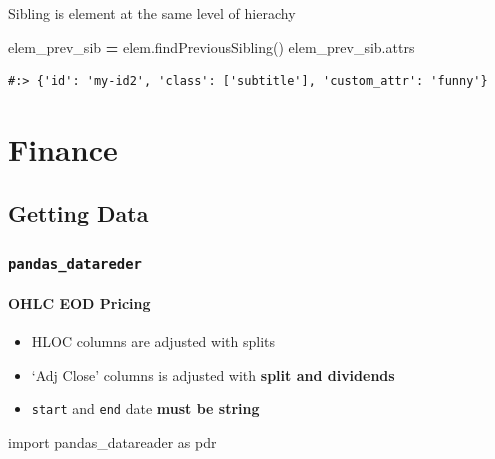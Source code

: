 \documentclass[
]{book}
\newenvironment{Shaded}{\begin{snugshade}}{\end{snugshade}}
\newcommand{\ImportTok}[1]{#1}
\newcommand{\NormalTok}[1]{#1}
\newcommand{\OperatorTok}[1]{\textcolor[rgb]{0.43,0.43,0.43}{\textbf{#1}}}
\providecommand{\tightlist}{%
  \setlength{\itemsep}{0pt}\setlength{\parskip}{0pt}}
\begin{document}
Sibling is element at the same level of hierachy

\begin{Shaded}
\begin{Highlighting}[]
\NormalTok{elem_prev_sib }\OperatorTok{=}\NormalTok{ elem.findPreviousSibling()}
\NormalTok{elem_prev_sib.attrs}
\end{Highlighting}
\end{Shaded}

\begin{verbatim}
#:> {'id': 'my-id2', 'class': ['subtitle'], 'custom_attr': 'funny'}
\end{verbatim}

\hypertarget{finance}{%
\chapter{Finance}\label{finance}}

\hypertarget{getting-data}{%
\section{Getting Data}\label{getting-data}}

\hypertarget{pandas_datareder}{%
\subsection{\texorpdfstring{\texttt{pandas\_datareder}}{pandas\_datareder}}\label{pandas_datareder}}

\hypertarget{ohlc-eod-pricing}{%
\subsubsection{OHLC EOD Pricing}\label{ohlc-eod-pricing}}

\begin{itemize}
\tightlist
\item
  HLOC columns are adjusted with splits\\
\item
  `Adj Close' columns is adjusted with \textbf{split and dividends}\\
\item
  \texttt{start} and \texttt{end} date \textbf{must be string}
\end{itemize}

\begin{Shaded}
\begin{Highlighting}[]
\ImportTok{import}\NormalTok{ pandas_datareader }\ImportTok{as}\NormalTok{ pdr}
\end{Highlighting}
\end{Shaded}
\end{document}
